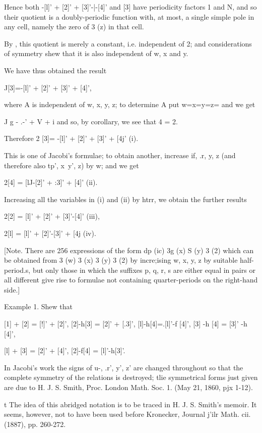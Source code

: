 Hence both -[l]' + [2]' + [3]'-|-[4]' and [3] have periodicity factors
1 and N, and so their quotient is a doubly-periodic function with, at
most, a single simple pole in any cell, namely the zero of 3 (z) in
that cell.

By , this quotient is merely a constant, i.e. independent of 2;
and considerations of symmetry shew that it is also independent of w,
x and y.

We have thus obtained the result

J[3]=-[l]' + [2]' + [3]' + [4]',

where A is independent of w, x, y, z; to determine A put w=x=y=z= and
we get

J g - .-' + V + i and so, by  corollary, we see that 4 = 2.

Therefore 2 [3]= -[l]' + [2]' + [3]' + [4j' (i).

This is one of Jacobi's formulae; to obtain another, increase if, .r,
y, z (and therefore also tp', x\ y', z) by w; and we get

2[4] = [lJ-[2]' + :3]' + [4]' (ii).

Increasing all the variables in (i) and (ii) by htrr, we obtain the
further results

2[2] = [l]' + [2]' + [3]'-[4]' (iii),

2[l] = [l]' + [2]'-[3]' + [4j (iv).

[Note. There are 256 expressions of the form dp (ic) 3g (x) S (y) 3
(2) which can be obtained from 3 (w) 3 (x) 3 (y) 3 (2) by incre;ising
w, x, y, z by suitable half-period.s, but only those in which the
suffixes p, q, r, s are either equal in pairs or all different give
rise to formulae not containing quarter-periods on the right-hand
side.]

Example 1. Shew that

[1] + [2] = [!]' + [2]', [2]-h[3] = [2]' + [.3]', [l]-h[4]=.[l]'-f
[4]', [3] -h [4] = [3]' -h [4]',

[l] + [3] = [2]' + [4]', [2]-f[4] = [l]'-h[3]'.

In Jacobi's work the signs of u-, .r', y', z' are changed throughout
so that the complete symmetry of the relations is destroyed; tlie
symmetrical forms just given are due to H. J. S. Smith, Proc. London
Math. Soc. 1. (May 21, 1860, pjx 1-12).

t The idea of this abridged notation is to be traced in H. J. S.
Smith's memoir. It seems, however, not to have been used before
Kronecker, Journal j'ilr Math. cii. (1887), pp. 260-272.

